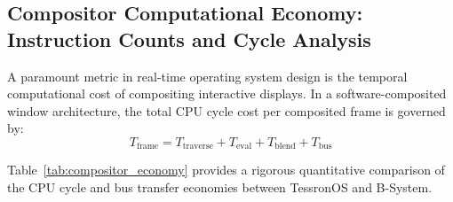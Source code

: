 \documentclass[10pt,journal,compsoc,twocolumn]{article}
\begin{document}
\subsection{Compositor Computational Economy: Instruction Counts and Cycle Analysis}

A paramount metric in real-time operating system design is the temporal computational cost of compositing interactive displays. In a software-composited window architecture, the total CPU cycle cost per composited frame is governed by:
\begin{equation}
T_{\text{frame}} = T_{\text{traverse}} + T_{\text{eval}} + T_{\text{blend}} + T_{\text{bus}}
\end{equation}

Table~\ref{tab:compositor_economy} provides a rigorous quantitative comparison of the CPU cycle and bus transfer economies between TessronOS and B-System.
\end{document}
